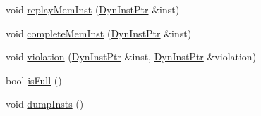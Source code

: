 \begin{DoxyCompactItemize}
\item 
void \hyperlink{classBackEnd_1_1InstQueue_ae165df775b4de9e9430228c7f04c2bc9}{replayMemInst} (\hyperlink{classBackEnd_a028ce10889c5f6450239d9e9a7347976}{DynInstPtr} \&inst)
\item 
void \hyperlink{classBackEnd_1_1InstQueue_a2212f511dc1886c073cf7ff1665f5c87}{completeMemInst} (\hyperlink{classBackEnd_a028ce10889c5f6450239d9e9a7347976}{DynInstPtr} \&inst)
\item 
void \hyperlink{classBackEnd_1_1InstQueue_ab275fd0e813e657e63aaea4d23629c0c}{violation} (\hyperlink{classBackEnd_a028ce10889c5f6450239d9e9a7347976}{DynInstPtr} \&inst, \hyperlink{classBackEnd_a028ce10889c5f6450239d9e9a7347976}{DynInstPtr} \&violation)
\item 
bool \hyperlink{classBackEnd_1_1InstQueue_a3e70330939fdfc4dbc2f60c1a660584d}{isFull} ()
\item 
void \hyperlink{classBackEnd_1_1InstQueue_a80587b4fe043bbe1995536cb3b361588}{dumpInsts} ()
\end{DoxyCompactItemize}

